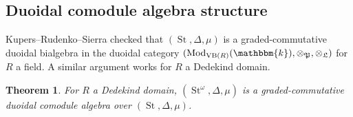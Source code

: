 \documentclass[11pt,letterpaper]{amsart}
\newcommand{\bk}{\mathbbm{k}}
\DeclareMathOperator{\Mod}{Mod}
\DeclareMathOperator{\VB}{VB}
\newcommand{\PP}{\mathfrak{P}}
\newcommand{\LL}{\mathfrak{L}}
\numberwithin{theoremcounter}{section}
\newtheorem{theorem}[theoremauto]{Theorem}
\theoremstyle{definition}
\theoremstyle{remark}
\DeclareMathOperator{\St}{St}
\begin{document}
\subsection{Duoidal comodule algebra structure} \label{compat}

Kupers--Rudenko--Sierra \cite[Section 2.3]{KRS1} checked that
 $(\St,\Delta,\mu)$ is a graded-commutative duoidal bialgebra in the duoidal category $(\Mod_{\VB(R)}(\bk),\otimes_\PP,\otimes_\LL)$ for $R$ a field. A similar argument works for $R$ a Dedekind domain.







\begin{theorem} \label{commutingSp}
 For $R$ a Dedekind domain, $(\St^\omega,\Delta,\mu)$ is a graded-commutative duoidal comodule algebra over $(\St,\Delta,\mu)$.
\end{theorem}
\end{document}
